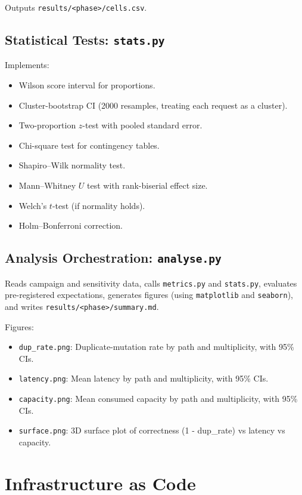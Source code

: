 Outputs \texttt{results/<phase>/cells.csv}.

\subsection{Statistical Tests: \texttt{stats.py}}

Implements:

\begin{itemize}
    \item Wilson score interval for proportions.
    \item Cluster-bootstrap CI (2000 resamples, treating each request as a cluster).
    \item Two-proportion $z$-test with pooled standard error.
    \item Chi-square test for contingency tables.
    \item Shapiro–Wilk normality test.
    \item Mann–Whitney $U$ test with rank-biserial effect size.
    \item Welch's $t$-test (if normality holds).
    \item Holm–Bonferroni correction.
\end{itemize}

\subsection{Analysis Orchestration: \texttt{analyse.py}}

Reads campaign and sensitivity data, calls \texttt{metrics.py} and \texttt{stats.py}, evaluates pre-registered expectations, generates figures (using \texttt{matplotlib} and \texttt{seaborn}), and writes \texttt{results/<phase>/summary.md}.

Figures:

\begin{itemize}
    \item \texttt{dup\_rate.png}: Duplicate-mutation rate by path and multiplicity, with 95\% CIs.
    \item \texttt{latency.png}: Mean latency by path and multiplicity, with 95\% CIs.
    \item \texttt{capacity.png}: Mean consumed capacity by path and multiplicity, with 95\% CIs.
    \item \texttt{surface.png}: 3D surface plot of correctness (1 - dup\_rate) vs latency vs capacity.
\end{itemize}

\section{Infrastructure as Code}

